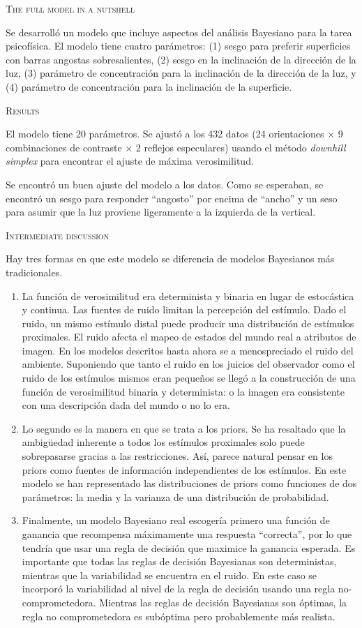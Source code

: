 \documentclass[a4paper,12pt]{article}
\begin{document}
{\scshape The full model in a nutshell}

Se desarrolló un modelo que incluye aspectos del análisis Bayesiano para la tarea psicofísica. El modelo tiene cuatro parámetros: (1) sesgo para preferir superficies con barras angostas sobresalientes, (2) sesgo en la inclinación de la dirección de la luz, (3) parámetro de concentración para la inclinación de la dirección de la luz, y (4) parámetro de concentración para la inclinación de la superficie.

{\scshape Results}

El modelo tiene 20 parámetros. Se ajustó a los 432 datos (24 orientaciones $\times$ 9 combinaciones de contraste $\times$ 2 reflejos especulares) usando el método {\itshape downhill simplex} para encontrar el ajuste de máxima verosimilitud. 

Se encontró un buen ajuste del modelo a los datos. Como se esperaban, se encontró un sesgo para responder ``angosto'' por encima de ``ancho'' y un seso para asumir que la luz proviene ligeramente a la izquierda de la vertical.

{\scshape Intermediate discussion}

Hay tres formas en que este modelo se diferencia de modelos Bayesianos más tradicionales.

\begin{enumerate}
	\item La función de verosimilitud era determinista y binaria en lugar de estocástica y continua. Las fuentes de ruido limitan la percepción del estímulo. Dado el ruido, un mismo estímulo distal puede producir una distribución de estímulos proximales. El ruido afecta el mapeo de estados del mundo real a atributos de imagen. En los modelos descritos hasta ahora se a menospreciado el ruido del ambiente. Suponiendo que tanto el ruido en los juicios del observador como el ruido de los estímulos mismos eran pequeños se llegó a la construcción de una función de verosimilitud binaria y determinista: o la imagen era consistente con una descripción dada del mundo o no lo era.
	\item Lo segundo es la manera en que se trata a los priors. Se ha resaltado que la ambigüedad inherente a todos los estímulos proximales solo puede sobrepasarse gracias a las restricciones. Así, parece natural pensar en los priors como fuentes de información independientes de los estímulos. En este modelo se han representado las distribuciones de priors como funciones de dos parámetros: la media y la varianza de una distribución de probabilidad. 
	\item Finalmente, un modelo Bayesiano real escogería primero una función de ganancia que recompensa máximamente una respuesta ``correcta'', por lo que tendría que usar una regla de decisión que maximice la ganancia esperada. Es importante que todas las reglas de decisión Bayesianas son deterministas, mientras que la variabilidad se encuentra en el ruido. En este caso se incorporó la variabilidad al nivel de la regla de decisión usando una regla no-comprometedora. Mientras las reglas de decisión Bayesianas son óptimas, la regla no comprometedora es subóptima pero probablemente más realista.
\end{enumerate}
\end{document}
